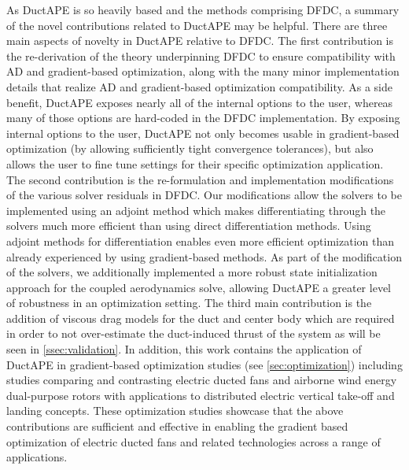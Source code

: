 As DuctAPE is so heavily based and the methods comprising DFDC, a summary of the novel contributions related to DuctAPE may be helpful.
%
There are three main aspects of novelty in DuctAPE relative to DFDC.
%
The first contribution is the re-derivation of the theory underpinning DFDC to ensure compatibility with AD and gradient-based optimization, along with the many minor implementation details that realize AD and gradient-based optimization compatibility.
%
As a side benefit, DuctAPE exposes nearly all of the internal options to the user, whereas many of those options are hard-coded in the DFDC implementation.
%
By exposing internal options to the user, DuctAPE not only becomes usable in gradient-based optimization (by allowing sufficiently tight convergence tolerances), but also allows the user to fine tune settings for their specific optimization application.
%
The second contribution is the re-formulation and implementation modifications of the various solver residuals in DFDC.
%
Our modifications allow the solvers to be implemented using an adjoint method which makes differentiating through the solvers much more efficient than using direct differentiation methods.
%
Using adjoint methods for differentiation enables even more efficient optimization than already experienced by using gradient-based methods.
%
As part of the modification of the solvers, we additionally implemented a more robust state initialization approach for the coupled aerodynamics solve, allowing DuctAPE a greater level of robustness in an optimization setting.
%
The third main contribution is the addition of viscous drag models for the duct and center body which are required in order to not over-estimate the duct-induced thrust of the system as will be seen in \cref{ssec:validation}.
%
In addition, this work contains the application of DuctAPE in gradient-based optimization studies (see \cref{sec:optimization}) including studies comparing and contrasting electric ducted fans and airborne wind energy dual-purpose rotors with applications to distributed electric vertical take-off and landing concepts.
%
These optimization studies showcase that the above contributions are sufficient and effective in enabling the gradient based optimization of electric ducted fans and related technologies across a range of applications.
